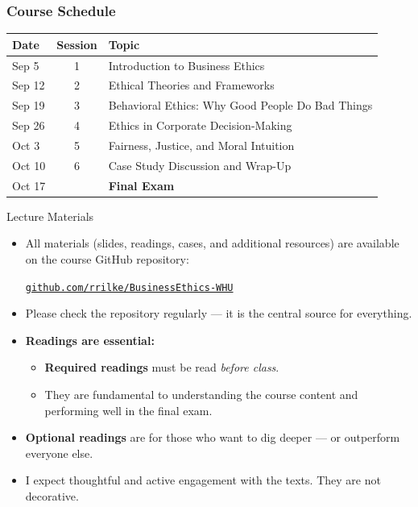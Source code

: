 \documentclass[aspectratio=169, 10pt]{beamer}
\begin{document}
\begin{frame}
\frametitle{Course Schedule}
\centering
\begin{tabular}{@{}lcp{8cm}@{}}
\toprule
\textbf{Date} & \textbf{Session} & \textbf{Topic} \\
\midrule
Sep 5   & 1 & Introduction to Business Ethics \\
Sep 12  & 2 & Ethical Theories and Frameworks \\
Sep 19  & 3 & Behavioral Ethics: Why Good People Do Bad Things \\
Sep 26  & 4 & Ethics in Corporate Decision-Making \\
Oct 3   & 5 & Fairness, Justice, and Moral Intuition \\
Oct 10  & 6 & Case Study Discussion and Wrap-Up \\
\midrule
Oct 17  & &\textbf{Final Exam} \\
\bottomrule
\end{tabular}
\end{frame}

\begin{frame}{Lecture Materials}

\begin{itemize}
  \item All materials (slides, readings, cases, and additional resources) are available on the course GitHub repository:
  
  \vspace{0.5em}
  \begin{center}
      \texttt{\href{https://github.com/rrilke/BusinessEthics-WHU}{github.com/rrilke/BusinessEthics-WHU}}
  \end{center}
  \vspace{0.5em}

  \item Please check the repository regularly — it is the central source for everything.
  
  \item \textbf{Readings are essential:}
  \begin{itemize}
    \item \textbf{Required readings} must be read \emph{before class}.
    \item They are fundamental to understanding the course content and performing well in the final exam.
  \end{itemize}
  \item \textbf{Optional readings} are for those who want to dig deeper — or outperform everyone else. 
  \item I expect thoughtful and active engagement with the texts. They are not decorative.
\end{itemize}

\end{frame}
 
\end{document}
